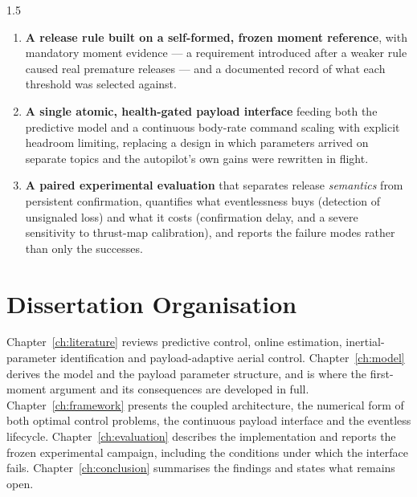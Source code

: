 \begin{spacing}{1.5}
\begin{enumerate}
\item \textbf{A release rule built on a self-formed, frozen moment reference},
with mandatory moment evidence --- a requirement introduced after a
weaker rule caused real premature releases --- and a documented record of what
each threshold was selected against.

\item \textbf{A single atomic, health-gated payload interface} feeding both the
predictive model and a continuous body-rate command scaling with explicit
headroom limiting, replacing a design in which parameters arrived on separate
topics and the autopilot's own gains were rewritten in flight.

\item \textbf{A paired experimental evaluation} that separates release
\emph{semantics} from persistent confirmation, quantifies what eventlessness buys
(detection of unsignaled loss) and what it costs (confirmation delay, and a
severe sensitivity to thrust-map calibration), and reports the failure modes
rather than only the successes.
\end{enumerate}

\section{Dissertation Organisation}

Chapter~\ref{ch:literature} reviews predictive control, online estimation,
inertial-parameter identification and payload-adaptive aerial control.
Chapter~\ref{ch:model} derives the model and the payload parameter structure, and
is where the first-moment argument and its consequences are developed in full.
Chapter~\ref{ch:framework} presents the coupled architecture, the numerical form
of both optimal control problems, the continuous payload interface and the
eventless lifecycle. Chapter~\ref{ch:evaluation} describes the implementation and
reports the frozen experimental campaign, including the conditions under which
the interface fails. Chapter~\ref{ch:conclusion} summarises the findings and
states what remains open.

\end{spacing}
\newpage
